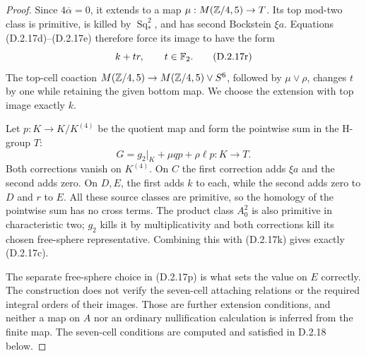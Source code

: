 \begin{proof}
Since $4\overline\alpha=0$, it extends to a map
$\mu:M(\mathbb Z/4,5)\to T$. Its top mod-two class is primitive,
is killed by $\operatorname{Sq}_*^2$, and has second
Bockstein $\xi a$. Equations \textup{(D.2.17d)--(D.2.17e)}
therefore force its image to have the form
\[
 k+t r,\qquad t\in\mathbb F_2.
 \tag{D.2.17r}
\]
The top-cell coaction
$M(\mathbb Z/4,5)\to M(\mathbb Z/4,5)\vee S^6$, followed by
$\mu\vee\rho$, changes $t$ by one while retaining the given
bottom map. We choose the extension with top image exactly $k$.

Let $p:K\to K/K^{(4)}$ be the quotient map and form the
pointwise sum in the H-group $T$:
\[
 G=g_2|_K+\mu q p+\rho\ell p:K\longrightarrow T.
 \tag{D.2.17s}
\]
Both corrections vanish on $K^{(4)}$. On $C$ the first
correction adds $\xi a$ and the second adds zero. On $D,E$,
the first adds $k$ to each, while the second adds zero to $D$
and $r$ to $E$. All these source classes are primitive, so
the homology of the pointwise sum has no cross terms. The
product class $A_0^2$ is also primitive in characteristic two;
$g_2$ kills it by multiplicativity and both corrections kill
its chosen free-sphere representative. Combining this with
\textup{(D.2.17k)} gives exactly \textup{(D.2.17c)}.

The separate free-sphere choice in \textup{(D.2.17p)} is what
sets the value on $E$ correctly. The construction does not
verify the seven-cell attaching relations or the required
integral orders of their images. Those are further extension
conditions, and neither a map on $A$ nor an ordinary
nullification calculation is inferred from the finite map.
The seven-cell conditions are computed and satisfied in D.2.18 below.
\end{proof}
